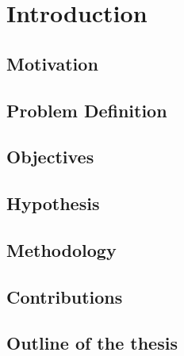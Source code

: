\chapter{Introduction}
\label{ch:Introduction}


\section{Motivation}
\label{sec:Motivation}


\section{Problem Definition}
\label{sec:Problem}


\section{Objectives}
\label{sec:Objectives}


\section{Hypothesis}
\label{sec:Hypothesis}


\section{Methodology}
\label{sec:Methodology}


\section{Contributions}
\label{sec:Contributions}


\section{Outline of the thesis}
\label{sec:Outline}

